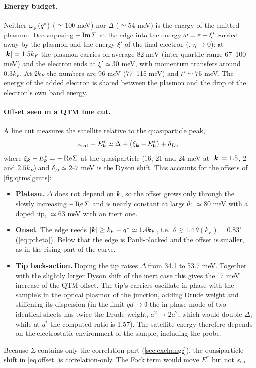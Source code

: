 \paragraph{Energy budget.} Neither $\omega_{\rm pl}(q^*)$ ($\simeq100$ meV) nor $\Delta$ ($\simeq54$ meV) is the energy of the emitted
plasmon. Decomposing $-\operatorname{Im}\Sigma$ at the edge into the energy $\omega=\varepsilon-\xi'$ carried away by the plasmon and the
energy $\xi'$ of the final electron (, $\eta\to0$): at $|\bm k|=1.5k_F$ the plasmon
carries on average 82 meV (inter-quartile range 67--100 meV) and the electron ends at $\xi'\simeq30$ meV, with
momentum transfers around $0.3k_F$. At $2k_F$ the numbers are 96 meV (77--115 meV) and $\xi'\simeq75$ meV. The energy
of the added electron is shared between the plasmon and the drop of the electron's own band energy.

\paragraph{Offset seen in a QTM line cut.} A line cut measures the satellite relative to the quasiparticle peak,
\begin{equation}
\varepsilon_{\rm sat}-E^*_{\bm k}\simeq\Delta+\bigl(\xi_{\bm k}-E^*_{\bm k}\bigr)+\delta_D ,
\label{eq:offset}
\end{equation}
where $\xi_{\bm k}-E^*_{\bm k}=-\operatorname{Re}\Sigma$ at the quasiparticle (16, 21 and 24 meV at $|\bm k|=1.5$, 2 and $2.5k_F$) and
$\delta_D\simeq2$--$7$ meV is the Dyson shift. This accounts for the offsets of \cref{fig:qtmslgcuts}:
\begin{itemize}
\item \textbf{Plateau.} $\Delta$ does not depend on $\bm k$, so the offset grows only through the slowly increasing
$-\operatorname{Re}\Sigma$ and is nearly constant at large $\theta$: $\simeq80$ meV with a doped tip, $\simeq63$ meV with an inert one.
\item \textbf{Onset.} The edge needs $|\bm k|\ge k_F+q^*\simeq1.4k_F$, i.e.\ $\theta\gtrsim1.4\,\theta(k_F)=0.83^\circ$
(\cref{eq:ptheta}). Below that the edge is Pauli-blocked and the offset is smaller, as in the rising part of the
curve.
\item \textbf{Tip back-action.} Doping the tip raises $\Delta$ from 34.1 to 53.7 meV. Together with the slightly
larger Dyson shift of the inert case this gives the 17 meV increase of the QTM offset. The tip's carriers oscillate in phase with the sample's in the optical
plasmon of the junction, adding Drude weight and stiffening its dispersion (in the limit $qd\to0$ the in-phase
mode of two identical sheets has twice the Drude weight, $a^2\to2a^2$, which would double $\Delta$, while at $q^*$ the
computed ratio is 1.57). The satellite energy therefore depends on the electrostatic environment of the
sample, including the probe.
\end{itemize}
Because $\Sigma$ contains only the correlation part (\cref{sec:exchange}), the quasiparticle shift in
\cref{eq:offset} is correlation-only. The Fock term would move $E^*$ but not $\varepsilon_{\rm sat}$.

